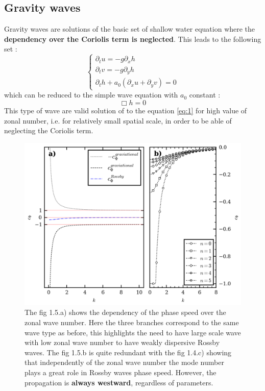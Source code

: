 \documentclass[11pt,a4paper]{report}
\begin{document}
\begin{multicols}{2}
    \subsection{Gravity waves}
    Gravity waves are solutions of the basic set of shallow water equation where the \textbf{dependency over the Coriolis term is neglected}.
    This leads to the following set :
    \begin{equation}
        \label{eq:8}
        \begin{cases}
            \partial_t u  = -g \partial_x h \\
            \partial_t v = -g \partial_y h  \\
            \partial_t h + a_0( \partial_x u + \partial_y v) = 0
        \end{cases}
    \end{equation}
    which can be reduced to the simple wave equation with $a_0$ constant :
    \begin{equation}
        \label{eq:9}
        \Box h = 0
    \end{equation}
    This type of wave are valid solution of to the equation \ref{eq:1} for high value of zonal number, i.e. for relatively small spatial scale, in order to be able of neglecting the Coriolis term.
    \begin{figure}[H]
        \includegraphics[width=\linewidth]{./figure/roots_k.png}
        \caption{\footnotesize{The fig 1.5.a) shows the dependency of the phase speed over the zonal wave number. Here the three branches correspond to the same wave type as before, this highlights the need to have large scale wave with low zonal wave number to have weakly dispersive Rossby waves. The fig 1.5.b is quite redundant with the fig 1.4.c)
                showing that independently of the zonal wave number the mode number plays a great role in Rossby waves phase speed. However, the propagation is \textbf{always westward}, regardless of parameters.}}
        \label{fig:}
    \end{figure}

\end{multicols}
\end{document}
